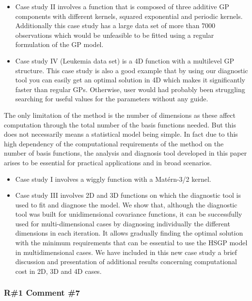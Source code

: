 \documentclass[11pt]{report}
\begin{document}
\begin{itemize}
\item Case study II involves a function that is composed of three additive GP components with different kernels, squared exponential and periodic kernels. Additionally this case study has a large data set of more than 7000 observations which would be unfeasible to be fitted using a regular formulation of the GP model.

\item Case study IV (Leukemia data set) is a 4D function with a multilevel GP structure. This case study is also a good example that by using our diagnostic tool you can easily get an optimal solution in 4D which makes it significantly faster than regular GPs. Otherwise, user would had probably been struggling searching for useful values for the parameters without any guide.
\end{itemize}

The only limitation of the method is the number of dimensions as these affect computation through the total number of the basis functions needed. But this does not necessarily means a statistical model being simple.
In fact due to this high dependency of the computational requirements of the method on the number of basis functions, the analysis and diagnosis tool developed in this paper arises to be essential for practical applications and in broad scenarios.

\begin{itemize}
\item Case study I involves a wiggly function with a Mat\'ern-3/2 kernel. 

\item Case study III involves 2D and 3D functions on which the diagnostic tool is used to fit and diagnose the model. We show that, although the diagnostic tool was built for unidimensional covariance functions, it can be successfully used for multi-dimensional cases by diagnosing individually the different dimensions in each iteration. It allows gradually finding the optimal solution with the minimum requirements that can be essential to use the HSGP model in multidimensional cases. We have included in this new case study a brief discussion and presentation of additional results concerning computational cost in 2D, 3D and 4D cases.
\end{itemize}

\subsubsection*{R\#1 Comment \#7}
\end{document}
